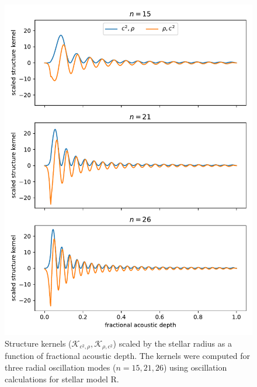 \begin{figure}
    \centering
    \includegraphics{figures/kernels.pdf}
    \caption[Structure kernels (\(\mathcal{K}_{c^2,\rho}, \mathcal{K}_{\rho,c^2}\)) scaled by the stellar radius as a function of fractional acoustic depth.]{Structure kernels (\(\mathcal{K}_{c^2,\rho}, \mathcal{K}_{\rho,c^2}\)) scaled by the stellar radius as a function of fractional acoustic depth. The kernels were computed for three radial oscillation modes (\(n=15,21,26\)) using oscillation calculations for stellar model R.}
    \label{fig:kernels}
\end{figure}

